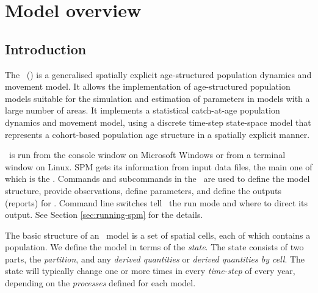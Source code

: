 \section{Model overview\label{sec:overview}}

\subsection{Introduction}

The \SPMName\ (\SPM) is a generalised spatially explicit age-structured population dynamics and movement model. It allows the implementation of age-structured population models suitable for the simulation and estimation of parameters in models with a large number of areas. It implements a statistical catch-at-age population dynamics and movement model, using a discrete time-step state-space model that represents a cohort-based population age structure in a spatially explicit manner. 

\SPM\ is run from the console window on Microsoft Windows or from a terminal window on Linux. SPM gets its information from input data files, the main one of which is the \emph{\config}. Commands and subcommands in the \config\ are used to define the model structure, provide observations, define parameters, and define the outputs (reports) for \SPM. Command line switches tell \SPM\ the run mode and where to direct its output. See Section \ref{sec:running-spm} for the details.

The basic structure  of an \SPM\ model is a set of spatial cells, each of which contains a population. We define the model in terms of the \emph{state}. The state consists of two parts, the \emph{partition}, and any \emph{derived quantities} or \emph{derived quantities by cell}. The state will typically change one or more times in every \emph{time-step} of every year, depending on the \emph{processes} defined for each model. 

